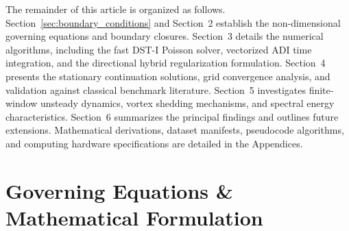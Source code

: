 \documentclass[11pt,a4paper]{article}
\begin{document}
The remainder of this article is organized as follows. Section~\ref{sec:boundary_conditions} and Section~2 establish the non-dimensional governing equations and boundary closures. Section~3 details the numerical algorithms, including the fast DST-I Poisson solver, vectorized ADI time integration, and the directional hybrid regularization formulation. Section~4 presents the stationary continuation solutions, grid convergence analysis, and validation against classical benchmark literature. Section~5 investigates finite-window unsteady dynamics, vortex shedding mechanisms, and spectral energy characteristics. Section~6 summarizes the principal findings and outlines future extensions. Mathematical derivations, dataset manifests, pseudocode algorithms, and computing hardware specifications are detailed in the Appendices.

\section{Governing Equations \& Mathematical Formulation}
\end{document}
